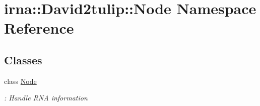 \hypertarget{namespaceirna_1_1David2tulip_1_1Node}{
\section{irna\-:\-:\-David2tulip\-:\-:\-Node \-Namespace \-Reference}
\label{namespaceirna_1_1David2tulip_1_1Node}
}
\subsection*{\-Classes}
\begin{DoxyCompactItemize}
\item 
class \hyperlink{classirna_1_1David2tulip_1_1Node_1_1Node}{\-Node}
\begin{DoxyCompactList}\small\item\em \-: \-Handle \-R\-N\-A information \end{DoxyCompactList}\end{DoxyCompactItemize}
